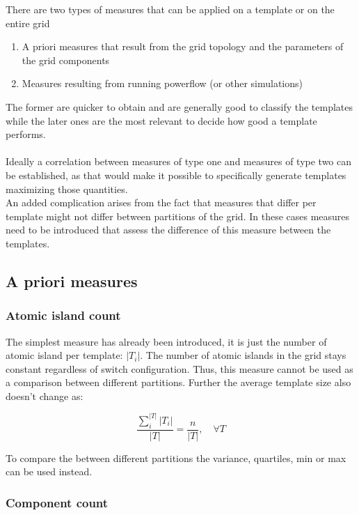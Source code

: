 There are two types of measures that can be applied on a template or on the entire grid 
\begin{enumerate}
  \item A priori measures that result from the grid topology and the parameters
  of the grid components
  \item Measures resulting from running powerflow (or other simulations)
\end{enumerate}

The former are quicker to obtain and are generally good to classify the templates while
the later ones are the most relevant to decide how good a template performs.\\
\\
Ideally a correlation between measures of type one and measures of type two can be
established, as that would make it possible to specifically generate templates
maximizing those quantities.
\\
An added complication arises from the fact that measures that differ per template
might not differ between partitions of the grid. In these cases measures need to be introduced
that assess the difference of this measure between the templates. 

\subsection{A priori measures}

\subsubsection{Atomic island count}

The simplest measure has already been introduced, it is just the number
of atomic island per template: $|T_i|$. The number of atomic
islands in the grid stays constant regardless of switch configuration.
Thus, this measure cannot be used as a comparison between different
partitions.
Further the average template size also doesn't change as: 

\begin{equation}
  \frac{\sum_i^{|T|} |T_i|}{|T|} = \frac{n}{|T|}, \quad \forall T
\end{equation}

To compare the between different partitions the variance, quartiles,
min or max can be used instead.

\subsubsection{Component count}

